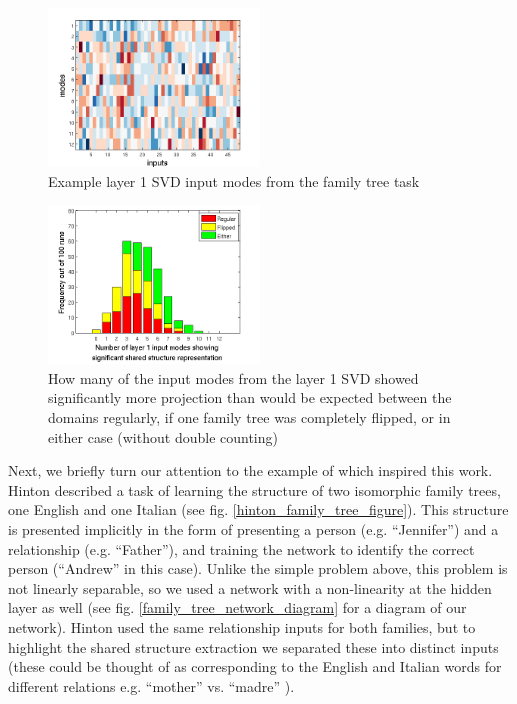 \documentclass[10pt,letterpaper]{article}
\begin{document}
\begin{figure}
\centering
\includegraphics[width=0.5\textwidth]{figures/ft_input_mode_example.png}
\caption{Example layer 1 SVD input modes from the family tree task}
\label{ft_input_mode_example}
\end{figure}

\begin{figure}
\centering
\includegraphics[width=0.5\textwidth]{figures/ft_input_mode_significance_hist.png}
\caption{How many of the input modes from the layer 1 SVD showed significantly more projection than would be expected between the domains regularly, if one family tree was completely flipped, or in either case (without double counting)}
\label{ft_input_mode_sig_hist}
\end{figure}
Next, we briefly turn our attention to the example of \citet{Hinton1986} which inspired this work. Hinton described a task of learning the structure of two isomorphic family trees, one English and one Italian (see fig. \ref{hinton_family_tree_figure}). This structure is presented implicitly in the form of presenting a person (e.g. ``Jennifer'') and a relationship (e.g. ``Father''), and training the network to identify the correct person (``Andrew'' in this case). Unlike the simple problem above, this problem is not linearly separable, so we used a network with a non-linearity at the hidden layer as well (see fig. \ref{family_tree_network_diagram} for a diagram of our network). Hinton used the same relationship inputs for both families, but to highlight the shared structure extraction we separated these into distinct inputs (these could be thought of as corresponding to the English and Italian words for different relations e.g. ``mother'' vs. ``madre'' ). \par 
\end{document}
